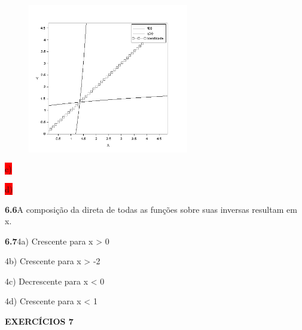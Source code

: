 \documentclass[12pt]{article}
\begin{document}
\begin{enumerate}
\begin{figure}[H]
	\begin{Center}
		\includegraphics[width=2.76in,height=2.57in]{./media/image18.png}
	\end{Center}
\end{figure}



\par


\vspace{\baselineskip}

\end{enumerate}\colorbox{Red}{c)}\par


\vspace{\baselineskip}
\colorbox{Red}{d)}\par


\vspace{\baselineskip}
\setlength{\parskip}{6.0pt}

\vspace{\baselineskip}

\vspace{\baselineskip}
\textbf{6.6\tab }A composição da direta de todas as funções sobre suas inversas resultam em x.\par

\setlength{\parskip}{0.0pt}
\textbf{6.7\tab }4a) Crescente para x > 0\par

\tab 4b) Crescente para x > -2\par

\tab 4c) Decrescente para x < 0\par

\tab 4d) Crescente para x < 1\par

\setlength{\parskip}{6.0pt}
\textbf{EXERCÍCIOS 7}\par
\end{document}
